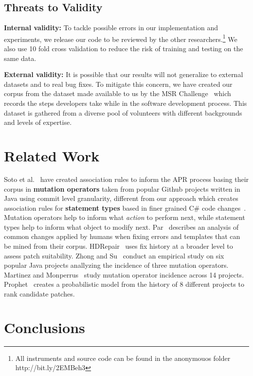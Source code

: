 \documentclass[sigconf]{acmart}
\begin{document}
\subsection{Threats to Validity}
\noindent\textbf{Internal validity:}
To tackle possible errors in our implementation and experiments, we release our code
to be reviewed by the other researchers.\footnote{All instruments
and source code can be found in the anonymouos folder 
http://bit.ly/2EMBeh3} 
We also use 10 fold cross validation 
to reduce the risk of training and testing on the same data.  

\noindent\textbf{External validity:} 
It is possible 
that our results will not generalize to external datasets and to
real bug fixes. To mitigate this concern, we have created our corpus 
from the dataset made available to us by the MSR Challenge~\cite{msr18challenge}
which records the steps developers take while in the software development process.
This dataset is gathered from a diverse pool of volunteers with different 
backgrounds and levels of expertise.


\section{ Related Work} 
Soto et al.~\cite{Soto18} have created association rules to inform the APR
process basing their corpus in \textbf{mutation operators} taken from popular Github projects
written in Java using commit level granularity, 
different from our approach which creates association rules for \textbf{statement types} 
based in finer grained C\# code changes~\cite{msr18challenge}. Mutation operators help to 
inform what \textit{action} to perform next, while statement types help to inform what
object to modify next. 
Par~\cite{kim2013} describes an analysis of common changes
applied by humans when fixing errors and templates that can be mined from
their corpus. HDRepair~\cite{xuan16} 
uses fix history at a broader level
to assess patch suitability.
Zhong and Su~\cite{zhong15} conduct an empirical study on six popular Java 
projects anallyzing the incidence of three mutation operators. 
Martinez and
Monperrus~\cite{martinez15} study mutation operator incidence across 
14 projects.
Prophet~\cite{long16proph} creates a
probabilistic model from 
the history of 8 different projects to rank candidate
patches.


\section{Conclusions}
\label{conclusions}
\end{document}

